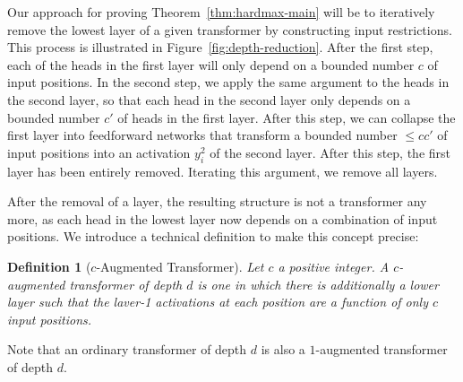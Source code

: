 \documentclass[11pt,a4paper]{article}
\newcounter{theorem}
\newtheorem{defin}[theorem]{Definition}
\begin{document}

Our approach for proving Theorem~\ref{thm:hardmax-main} will be to iteratively remove the lowest layer of a given transformer by constructing input restrictions.
This process is illustrated in Figure~\ref{fig:depth-reduction}.
After the first step, each of the heads in the first layer will only depend on a bounded number $c$ of input positions.
In the second step, we apply the same argument to the heads in the second layer, so that each head in the second layer only depends on a bounded number $c'$ of heads in the first layer.
After this step, we can collapse the first layer into feedforward networks that transform a bounded number $\leq cc'$ of input positions into an activation $y_i^2$ of the second layer.
After this step, the first layer has been entirely removed.
Iterating this argument, we remove all layers.

After the removal of a layer, the resulting structure is not a transformer any more, as each head in the lowest layer now depends on a combination of input positions.
We introduce a technical definition to make this concept precise:

\begin{defin}[$c$-Augmented Transformer]
Let $c$ a positive integer. A $c$-augmented transformer of depth $d$ is one in which there is additionally a lower layer such that the laver-1 activations at each position are a function of only $c$ input positions.
\end{defin}

Note that an ordinary transformer  of depth $d$ is also a $1$-augmented transformer of depth $d$.
\end{document}
